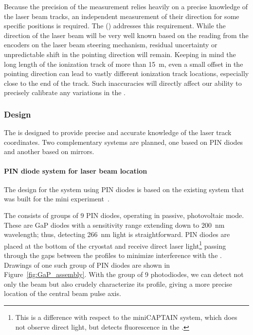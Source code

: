 \label{sec:calib-laser-pos}
Because the precision of the \efield measurement relies heavily on a precise knowledge of the laser beam tracks, an independent measurement of their direction for some specific positions is required. The %
 ()
addresses this requirement. While the direction of the laser beam will be very well known based on the reading from the encoders on the laser beam steering mechanism,  residual uncertainty or unpredictable shift in the pointing direction will remain. 
Keeping in mind the long length of the ionization track of more than \SI{15}{\m}, even a small offset in the pointing direction can lead to vastly different ionization track locations, especially close to the end of the track. Such inaccuracies will directly affect our ability to precisely calibrate any variations in the \efield.

\subsubsection{Design}
The  is designed to provide precise and accurate knowledge of the laser track coordinates.  
Two complementary systems are planned, one based on PIN diodes and another based on mirrors.

\paragraph{PIN diode system for laser beam location}

The design for the system using PIN diodes is based on the existing system that was built for the mini experiment~\cite{Berns:2013usa}.


The  consists of groups of \num{9} PIN diodes, operating in passive, photovoltaic mode. These are GaP diodes with a sensitivity range extending down to  \SI{200}{\nano\m} wavelength; thus, detecting \SI{266}{\nano\m} light is straightforward. 
PIN diodes are placed at the bottom of the cryostat and receive direct laser light\footnote{This is a difference with respect to the miniCAPTAIN system, which does not observe direct light, but detects fluorescence in the \frfour.} passing through the gaps between the  profiles to minimize interference with the . Drawings of one such group of PIN diodes are shown in Figure~\ref{fig:GaP_assembly}. With the group of \num{9} photodiodes, we can detect not only the beam but also crudely characterize its profile, giving a more precise location of the central beam pulse axis. 


